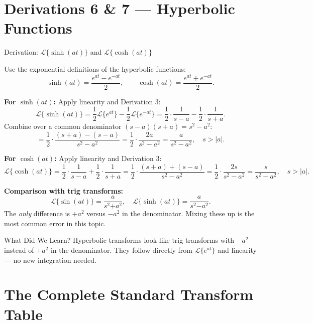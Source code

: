 \documentclass[12pt,a4paper]{article}
\begin{document}
\section{Derivations 6 \& 7 --- Hyperbolic Functions}

\begin{infobox}{Derivation: $\mathcal{L}\{\sinh(at)\}$ and $\mathcal{L}\{\cosh(at)\}$}

Use the exponential definitions of the hyperbolic functions:
\[
  \sinh(at) = \frac{e^{at} - e^{-at}}{2}, \qquad
  \cosh(at) = \frac{e^{at} + e^{-at}}{2}.
\]

\textbf{For $\sinh(at)$:} Apply linearity and Derivation 3:
\[
  \mathcal{L}\{\sinh(at)\}
  = \frac{1}{2}\mathcal{L}\{e^{at}\} - \frac{1}{2}\mathcal{L}\{e^{-at}\}
  = \frac{1}{2}\cdot\frac{1}{s-a} - \frac{1}{2}\cdot\frac{1}{s+a}.
\]
Combine over a common denominator $(s-a)(s+a) = s^2 - a^2$:
\[
  = \frac{1}{2}\cdot\frac{(s+a) - (s-a)}{s^2 - a^2}
  = \frac{1}{2}\cdot\frac{2a}{s^2-a^2}
  = \boxed{\frac{a}{s^2-a^2}}, \quad s > |a|.
\]

\textbf{For $\cosh(at)$:} Apply linearity and Derivation 3:
\[
  \mathcal{L}\{\cosh(at)\}
  = \frac{1}{2}\cdot\frac{1}{s-a} + \frac{1}{2}\cdot\frac{1}{s+a}
  = \frac{1}{2}\cdot\frac{(s+a)+(s-a)}{s^2-a^2}
  = \frac{1}{2}\cdot\frac{2s}{s^2-a^2}
  = \boxed{\frac{s}{s^2-a^2}}, \quad s > |a|.
\]

\textbf{Comparison with trig transforms:}
\[
  \mathcal{L}\{\sin(at)\} = \frac{a}{s^2 \mathbf{+} a^2}, \quad
  \mathcal{L}\{\sinh(at)\} = \frac{a}{s^2 \mathbf{-} a^2}.
\]
The \emph{only} difference is $+a^2$ versus $-a^2$ in the denominator. Mixing these up is
the most common error in this topic.
\end{infobox}

\begin{learnbox}{What Did We Learn?}
Hyperbolic transforms look like trig transforms with $-a^2$ instead of $+a^2$ in the
denominator. They follow directly from $\mathcal{L}\{e^{at}\}$ and linearity --- no new
integration needed.
\end{learnbox}

\section{The Complete Standard Transform Table}
\end{document}
